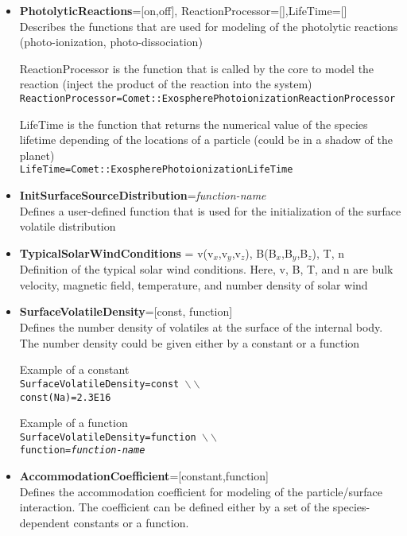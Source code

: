 \begin{itemize}
\item {\bf PhotolyticReactions}=[on,off], ReactionProcessor=[],LifeTime=[]  \\ Describes the functions that are used for modeling of the photolytic reactions (photo-ionization, photo-dissociation)

ReactionProcessor is the function that is called by the core to model the reaction (inject the product of the reaction into the system) \\ {\tt ReactionProcessor=Comet::ExospherePhotoionizationReactionProcessor}

LifeTime is the function that returns the numerical value of the species lifetime depending of the locations of a particle (could be in a shadow of the planet) \\ 
{\tt LifeTime=Comet::ExospherePhotoionizationLifeTime} 


\item {\bf InitSurfaceSourceDistribution}={\it function-name} \\ Defines a user-defined function that is used for the initialization of the surface volatile distribution 

\item {\bf TypicalSolarWindConditions} = v(v$_x$,v$_y$,v$_z$), B(B$_x$,B$_y$,B$_z$), T, n \\ Definition of the typical solar wind conditions. Here, v, B, T, and n are bulk velocity, magnetic field, temperature, and number density of solar wind

\item {\bf SurfaceVolatileDensity}=[const, function] \\ Defines the number density of volatiles at the surface of the internal body. The number density could be given either by a constant or a function 
 
Example of a constant \\ {\tt SurfaceVolatileDensity=const  $\backslash\backslash$ \\ const(Na)=2.3E16}

Example of a function \\ {\tt SurfaceVolatileDensity=function $\backslash\backslash$ \\ function={\it function-name}}


\item {\bf AccommodationCoefficient}=[constant,function] \\ Defines the accommodation coefficient for modeling of the particle/surface interaction. The coefficient can be defined either by a set of the species-dependent constants or a function.


\end{itemize}
